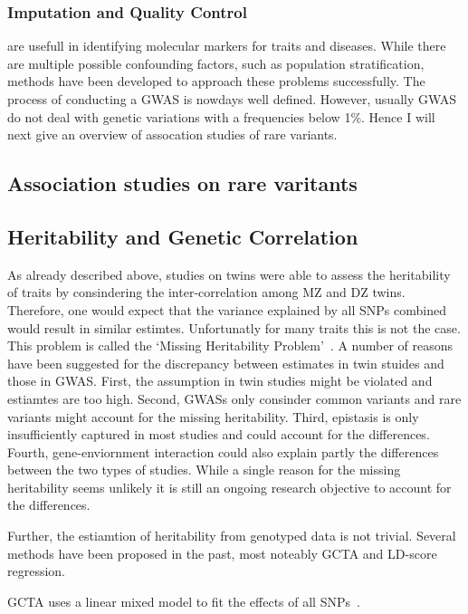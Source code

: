 \subsubsection{Imputation and Quality Control}
\label{ssub:imputation_and_quality_control}

\vfill
{} are usefull in identifying molecular markers for traits and diseases.
While there are multiple possible confounding factors, such as population stratification, methods have been developed to approach these problems successfully.
The process of conducting a GWAS is nowdays well defined.
However, usually GWAS do not deal with genetic variations with a frequencies below 1\%.
Hence I will next give an overview of assocation studies of rare variants.

\subsection{Association studies on rare varitants}
\label{sub:association_studies_on_rare_varitants}

\subsection{Heritability and Genetic Correlation}
\label{sub:heritability_and_genetic_correlation}

As already described above, studies on twins were able to assess the heritability of traits by consindering the inter-correlation among MZ and DZ twins.
Therefore, one would expect that the variance explained by all SNPs combined would result in similar estimtes.
Unfortunatly for many traits this is not the case.
This problem is called the `Missing Heritability Problem'~\cite{Vineis2010}.
A number of reasons have been suggested for the discrepancy between estimates in twin stuides and those in GWAS\@.
First, the assumption in twin studies might be violated and estiamtes are too high.
Second, GWASs only consinder common variants and rare variants might account for the missing heritability.
Third, epistasis is only insufficiently captured in most studies and could account for the differences.
Fourth, gene-enviornment interaction could also explain partly the differences between the two types of studies.
While a single reason for the missing heritability seems unlikely it is still an ongoing research objective to account for the differences.

Further, the estiamtion of heritability from genotyped data is not trivial.
Several methods have been proposed in the past, most noteably GCTA and LD-score regression.

GCTA uses a linear mixed model to fit the effects of all SNPs~\cite{Yang2011}.

